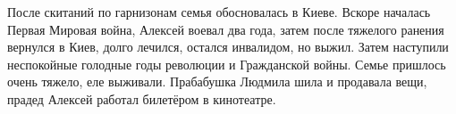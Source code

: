 \raggedcolumns
\begin{multicols}{2} %
\setlength{\parindent}{0pt}



\end{multicols} %

\zzrule

После скитаний по гарнизонам семья обосновалась в Киеве. Вскоре началась Первая
Мировая война, Алексей воевал два года, затем после тяжелого ранения вернулся в
Киев, долго лечился, остался инвалидом, но выжил. Затем наступили неспокойные
голодные годы революции и Гражданской войны. Семье пришлось очень тяжело, еле
выживали. Прабабушка Людмила шила и продавала вещи, прадед Алексей работал
билетёром в кинотеатре.

\zzrule

